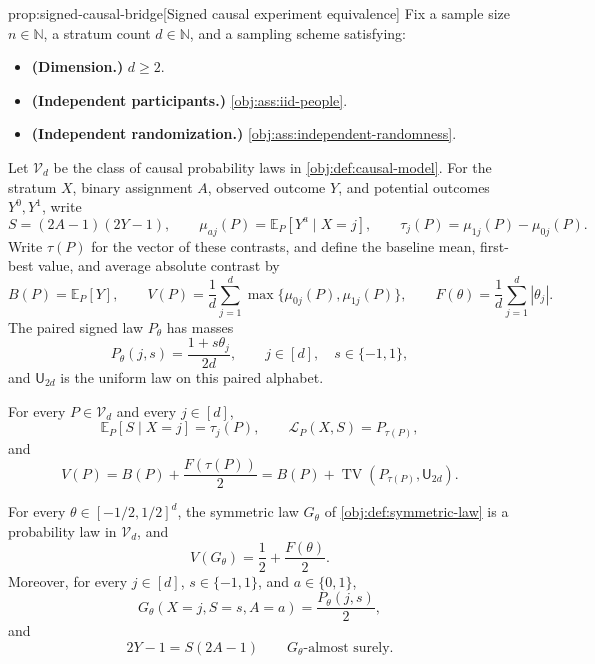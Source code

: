 \begin{propositionv}{prop:signed-causal-bridge}[Signed causal experiment equivalence]
Fix a sample size \(n\in\mathbb N\), a stratum count \(d\in\mathbb N\), and a sampling scheme satisfying:
\begin{itemize}
\item \textbf{(Dimension.)} \(d\ge 2\).
\item \textbf{(Independent participants.)} \cref{obj:ass:iid-people}.
\item \textbf{(Independent randomization.)} \cref{obj:ass:independent-randomness}.
\end{itemize}
Let \(\mathcal V_d\) be the class of causal probability laws in \cref{obj:def:causal-model}. For the stratum \(X\), binary assignment \(A\), observed outcome \(Y\), and potential outcomes \(Y^0,Y^1\), write
\[
S=(2A-1)(2Y-1),\qquad
\mu_{aj}(P)=\mathbb E_P[Y^a\mid X=j],\qquad
\tau_j(P)=\mu_{1j}(P)-\mu_{0j}(P).
\]
Write \(\tau(P)\) for the vector of these contrasts, and define the baseline mean, first-best value, and average absolute contrast by
\[
B(P)=\mathbb E_P[Y],\qquad
V(P)=\frac1d\sum_{j=1}^d\max\{\mu_{0j}(P),\mu_{1j}(P)\},
\qquad
F(\theta)=\frac1d\sum_{j=1}^d|\theta_j|.
\]
The paired signed law \(P_\theta\) has masses
\[
P_\theta(j,s)=\frac{1+s\theta_j}{2d},
\qquad j\in[d],\quad s\in\{-1,1\},
\]
and \(\mathsf U_{2d}\) is the uniform law on this paired alphabet.

For every \(P\in\mathcal V_d\) and every \(j\in[d]\),
\[
\mathbb E_P[S\mid X=j]=\tau_j(P),
\qquad
\mathcal L_P(X,S)=P_{\tau(P)},
\]
and
\[
V(P)
=B(P)+\frac{F(\tau(P))}{2}
=B(P)+\operatorname{TV}(P_{\tau(P)},\mathsf U_{2d}).
\]

For every \(\theta\in[-1/2,1/2]^d\), the symmetric law \(G_\theta\) of \cref{obj:def:symmetric-law} is a probability law in \(\mathcal V_d\), and
\[
V(G_\theta)=\frac12+\frac{F(\theta)}2.
\]
Moreover, for every \(j\in[d]\), \(s\in\{-1,1\}\), and \(a\in\{0,1\}\),
\[
G_\theta(X=j,S=s,A=a)=\frac{P_\theta(j,s)}2,
\]
and
\[
2Y-1=S(2A-1)
\qquad G_\theta\text{-almost surely}.
\]


\end{propositionv}
